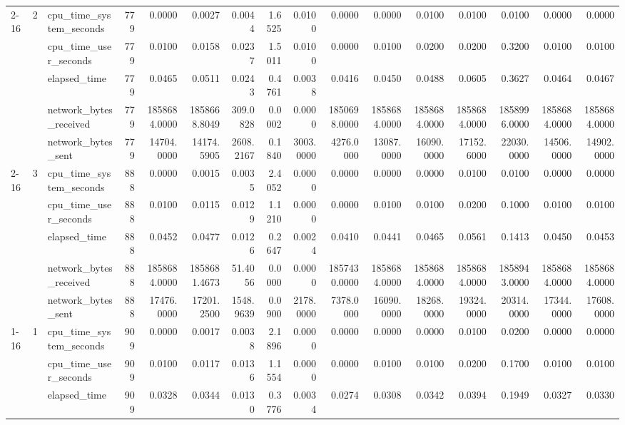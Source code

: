 \begin{tabular}{lllrrrrrrrrrrrrr}
\cline{2-16}
 & \multirow[t]{5}{*}{2} & cpu\_time\_system\_seconds & 779 & 0.0000 & 0.0027 & 0.0044 & 1.6525 & 0.0100 & 0.0000 & 0.0000 & 0.0100 & 0.0100 & 0.0100 & 0.0000 & 0.0000 \\
 &  & cpu\_time\_user\_seconds & 779 & 0.0100 & 0.0158 & 0.0237 & 1.5011 & 0.0100 & 0.0000 & 0.0100 & 0.0200 & 0.0200 & 0.3200 & 0.0100 & 0.0100 \\
 &  & elapsed\_time & 779 & 0.0465 & 0.0511 & 0.0243 & 0.4761 & 0.0038 & 0.0416 & 0.0450 & 0.0488 & 0.0605 & 0.3627 & 0.0464 & 0.0467 \\
 &  & network\_bytes\_received & 779 & 1858684.0000 & 1858668.8049 & 309.0828 & 0.0002 & 0.0000 & 1850698.0000 & 1858684.0000 & 1858684.0000 & 1858684.0000 & 1858996.0000 & 1858684.0000 & 1858684.0000 \\
 &  & network\_bytes\_sent & 779 & 14704.0000 & 14174.5905 & 2608.2167 & 0.1840 & 3003.0000 & 4276.0000 & 13087.0000 & 16090.0000 & 17152.6000 & 22030.0000 & 14506.0000 & 14902.0000 \\
\cline{2-16}
 & \multirow[t]{5}{*}{3} & cpu\_time\_system\_seconds & 888 & 0.0000 & 0.0015 & 0.0035 & 2.4052 & 0.0000 & 0.0000 & 0.0000 & 0.0000 & 0.0100 & 0.0100 & 0.0000 & 0.0000 \\
 &  & cpu\_time\_user\_seconds & 888 & 0.0100 & 0.0115 & 0.0129 & 1.1210 & 0.0000 & 0.0000 & 0.0100 & 0.0100 & 0.0200 & 0.1000 & 0.0100 & 0.0100 \\
 &  & elapsed\_time & 888 & 0.0452 & 0.0477 & 0.0126 & 0.2647 & 0.0024 & 0.0410 & 0.0441 & 0.0465 & 0.0561 & 0.1413 & 0.0450 & 0.0453 \\
 &  & network\_bytes\_received & 888 & 1858684.0000 & 1858681.4673 & 51.4056 & 0.0000 & 0.0000 & 1857430.0000 & 1858684.0000 & 1858684.0000 & 1858684.0000 & 1858943.0000 & 1858684.0000 & 1858684.0000 \\
 &  & network\_bytes\_sent & 888 & 17476.0000 & 17201.2500 & 1548.9639 & 0.0900 & 2178.0000 & 7378.0000 & 16090.0000 & 18268.0000 & 19324.0000 & 20314.0000 & 17344.0000 & 17608.0000 \\
\cline{1-16} \cline{2-16}
\multirow[t]{15}{*}{bbox-filtering-postgis-small} & \multirow[t]{5}{*}{1} & cpu\_time\_system\_seconds & 909 & 0.0000 & 0.0017 & 0.0038 & 2.1896 & 0.0000 & 0.0000 & 0.0000 & 0.0000 & 0.0100 & 0.0200 & 0.0000 & 0.0000 \\
 &  & cpu\_time\_user\_seconds & 909 & 0.0100 & 0.0117 & 0.0136 & 1.1554 & 0.0000 & 0.0000 & 0.0100 & 0.0100 & 0.0200 & 0.1700 & 0.0100 & 0.0100 \\
 &  & elapsed\_time & 909 & 0.0328 & 0.0344 & 0.0130 & 0.3776 & 0.0034 & 0.0274 & 0.0308 & 0.0342 & 0.0394 & 0.1949 & 0.0327 & 0.0330 \\

\end{tabular}
